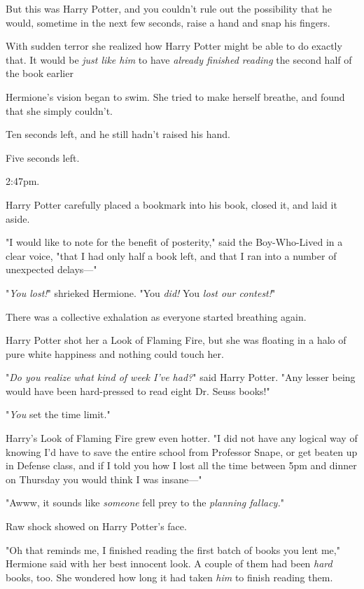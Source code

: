 But this was Harry Potter, and you couldn't rule out the possibility that he
would, sometime in the next few seconds, raise a hand and snap his fingers.

With sudden terror she realized how Harry Potter might be able to do exactly
that. It would be \emph{just like him} to have \emph{already finished reading}
the second half of the book earlier{\el}

Hermione's vision began to swim. She tried to make herself breathe, and found
that she simply couldn't.

Ten seconds left, and he still hadn't raised his hand.

Five seconds left.

2:47pm.

Harry Potter carefully placed a bookmark into his book, closed it, and laid it
aside.

"I would like to note for the benefit of posterity," said the Boy-Who-Lived in
a clear voice, "that I had only half a book left, and that I ran into a number
of unexpected delays—"

"\emph{You lost!}" shrieked Hermione. "You \emph{did!} You \emph{lost our
contest!}"

There was a collective exhalation as everyone started breathing again.

Harry Potter shot her a Look of Flaming Fire, but she was floating in a halo of
pure white happiness and nothing could touch her.

"\emph{Do you realize what kind of week I've had?}" said Harry Potter. "Any
lesser being would have been hard-pressed to read eight Dr. Seuss books!"

"\emph{You} set the time limit."

Harry's Look of Flaming Fire grew even hotter. "I did not have any logical way
of knowing I'd have to save the entire school from Professor Snape, or get
beaten up in Defense class, and if I told you how I lost all the time between
5pm and dinner on Thursday you would think I was insane—"

"Awww, it sounds like \emph{someone} fell prey to the \emph{planning fallacy.}"

Raw shock showed on Harry Potter's face.

"Oh that reminds me, I finished reading the first batch of books you lent me,"
Hermione said with her best innocent look. A couple of them had been
\emph{hard} books, too. She wondered how long it had taken \emph{him} to finish
reading them.


